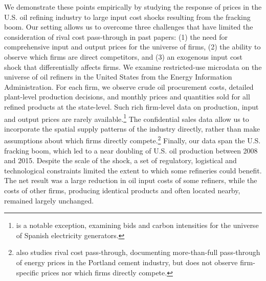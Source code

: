 \documentclass[12pt]{article}
\begin{document}
We demonstrate these points empirically by studying the response of prices in the U.S. oil refining industry to large input cost shocks resulting from the fracking boom. Our setting allows us to overcome three challenges that have limited the consideration of rival cost pass-through in past papers: (1) the need for comprehensive input and output prices for the universe of firms, (2) the ability to observe which firms are direct competitors, and (3) an exogenous input cost shock that differentially affects firms.  We examine restricted-use microdata on the universe of oil refiners in the United States from the Energy Information Administration.  For each firm, we observe crude oil procurement costs, detailed plant-level production decisions, and monthly prices and quantities sold for all refined products at the state-level. Such rich firm-level data on production, input and output prices are rarely available.\footnote{\citet{fabra_pass-through_2014} is a notable exception, examining bids and carbon intensities for the universe of Spanish electricity generators.}  The confidential sales data allow us to incorporate the spatial supply patterns of the industry directly, rather than make assumptions about which firms directly compete.\footnote{\citet{miller_pass-through_2017} also studies rival cost pass-through, documenting more-than-full pass-through of energy prices in the Portland cement industry, but does not observe firm-specific prices nor which firms directly compete.} Finally, our data span the U.S. fracking boom, which led to a near doubling of U.S. oil production between 2008 and 2015. Despite the scale of the shock, a set of regulatory, logistical and technological constraints limited the extent to which some refineries could benefit. The net result was a large reduction in oil input costs of some refiners, while the costs of other firms, producing identical products and often located nearby, remained largely unchanged.
\end{document}
